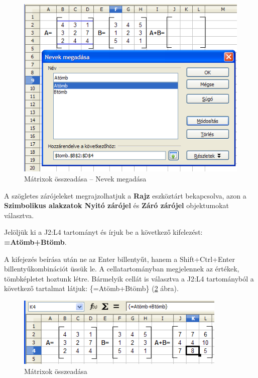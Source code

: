 \begin{figure}[!h]
\begin{center}
\includegraphics[width=12.751cm]{oocalcv1-img130.png}
\caption{Mátrixok összeadása -- Nevek megadása}\label{MátrixokÖsszeadásaNevek}
\end{center}
\end{figure}

A szögletes zárójeleket megrajzolhatjuk a \textbf{Rajz}
eszköztárt bekapcsolva, azon a \textbf{Szimbolikus alakzatok
Nyitó zárójel} és \textbf{Záró zárójel} objektumokat választva.

Jelöljük ki a J2:L4 tartományt és írjuk be a következő
kifelezést: {\sffamily\bfseries{=Atömb+Btömb}}.

A kifejezés beírása után ne az Enter billentyűt, hanem a
Shift+Ctrl+Enter billentyűkombinációt üssük le. A
cellatartományban megjelennek az értékek, tömbképletet
hoztunk létre. Bármelyik cellát is választva a J2:L4
tartományból a következő tartalmat látjuk:
\{=Atömb+Btömb\} (\ref{MátrixokÖsszeadása} ábra).

\begin{figure}[!h]
\begin{center}
\includegraphics[width=10.031cm]{oocalcv1-img131.png}
\caption{Mátrixok összeadása}\label{MátrixokÖsszeadása}
\end{center}
\end{figure}

